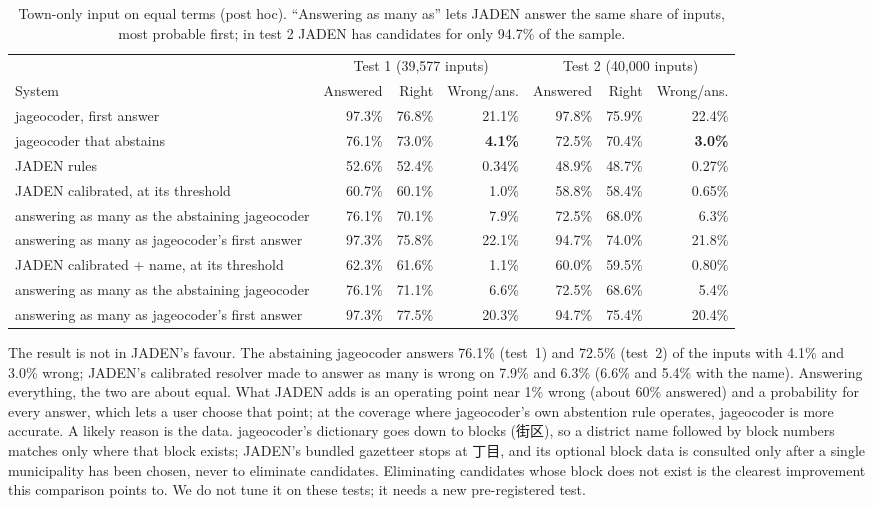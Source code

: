 \documentclass[10pt]{article}
\begin{document}
\begin{CJK}{UTF8}{min}
\begin{table}[t]
\centering\footnotesize\setlength{\tabcolsep}{4pt}
\begin{tabular}{@{}lrrrrrr@{}}
\toprule
& \multicolumn{3}{c}{Test 1 (39,577 inputs)} & \multicolumn{3}{c}{Test 2 (40,000 inputs)} \\
System & Answered & Right & Wrong/ans. & Answered & Right & Wrong/ans. \\
\midrule
jageocoder, first answer & 97.3\% & 76.8\% & 21.1\% & 97.8\% & 75.9\% & 22.4\% \\
jageocoder that abstains & 76.1\% & 73.0\% & \textbf{4.1\%} & 72.5\% & 70.4\% & \textbf{3.0\%} \\
JADEN rules & 52.6\% & 52.4\% & 0.34\% & 48.9\% & 48.7\% & 0.27\% \\
JADEN calibrated, at its threshold & 60.7\% & 60.1\% & 1.0\% & 58.8\% & 58.4\% & 0.65\% \\
\quad answering as many as the abstaining jageocoder & 76.1\% & 70.1\% & 7.9\% & 72.5\% & 68.0\% & 6.3\% \\
\quad answering as many as jageocoder's first answer & 97.3\% & 75.8\% & 22.1\% & 94.7\% & 74.0\% & 21.8\% \\
JADEN calibrated + name, at its threshold & 62.3\% & 61.6\% & 1.1\% & 60.0\% & 59.5\% & 0.80\% \\
\quad answering as many as the abstaining jageocoder & 76.1\% & 71.1\% & 6.6\% & 72.5\% & 68.6\% & 5.4\% \\
\quad answering as many as jageocoder's first answer & 97.3\% & 77.5\% & 20.3\% & 94.7\% & 75.4\% & 20.4\% \\
\bottomrule
\end{tabular}
\caption{Town-only input on equal terms (post hoc). ``Answering as many as'' lets JADEN answer the same
share of inputs, most probable first; in test 2 JADEN has candidates for only 94.7\% of the sample.}
\label{tab:fair}
\end{table}

The result is not in JADEN's favour. The abstaining jageocoder answers 76.1\% (test~1) and 72.5\% (test~2)
of the inputs with 4.1\% and 3.0\% wrong; JADEN's calibrated resolver made to answer as many is wrong on
7.9\% and 6.3\% (6.6\% and 5.4\% with the name). Answering everything, the two are about equal. What JADEN
adds is an operating point near 1\% wrong (about 60\% answered) and a probability for every answer, which
lets a user choose that point; at the coverage where jageocoder's own abstention rule operates,
jageocoder is more accurate. A likely reason is the data. jageocoder's dictionary goes down to blocks
(街区), so a district name followed by block numbers matches only where that block exists; JADEN's bundled
gazetteer stops at 丁目, and its optional block data is consulted only after a single municipality has been
chosen, never to eliminate candidates. Eliminating candidates whose block does not exist is the clearest
improvement this comparison points to. We do not tune it on these tests; it needs a new pre-registered
test.


\end{CJK}
\end{document}
